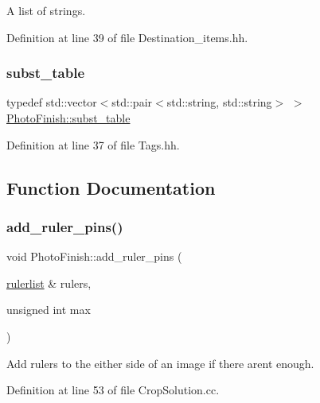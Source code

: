 A list of strings. 



Definition at line 39 of file Destination\+\_\+items.\+hh.

\mbox{\label{namespace_photo_finish_a99d3cfc086c8264e778255f5ef2b8b19}} 
\subsubsection{\texorpdfstring{subst\+\_\+table}{subst\_table}}
{\footnotesize\ttfamily typedef std\+::vector$<$std\+::pair$<$std\+::string, std\+::string$>$ $>$ \hyperlink{namespace_photo_finish_a99d3cfc086c8264e778255f5ef2b8b19}{Photo\+Finish\+::subst\+\_\+table}}



Definition at line 37 of file Tags.\+hh.



\subsection{Function Documentation}
\mbox{\label{namespace_photo_finish_aac9bbe14ef01bbb3692dfeba330c77b9}} 
\subsubsection{\texorpdfstring{add\+\_\+ruler\+\_\+pins()}{add\_ruler\_pins()}}
{\footnotesize\ttfamily void Photo\+Finish\+::add\+\_\+ruler\+\_\+pins (\begin{DoxyParamCaption}\item[{\hyperlink{namespace_photo_finish_a0abe5e95cf4de0f8f86aeabcf037082b}{rulerlist} \&}]{rulers,  }\item[{unsigned int}]{max }\end{DoxyParamCaption})}



Add rulers to the either side of an image if there aren\textquotesingle{}t enough. 



Definition at line 53 of file Crop\+Solution.\+cc.


